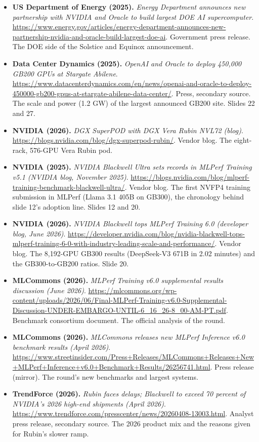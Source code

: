 \begin{itemize}[leftmargin=1.2em,itemsep=3pt]
\item \textbf{US Department of Energy (2025).} \textit{Energy Department announces new partnership with NVIDIA and Oracle to build largest DOE AI supercomputer}. \url{https://www.energy.gov/articles/energy-department-announces-new-partnership-nvidia-and-oracle-build-largest-doe-ai}. Government press release. The DOE side of the Solstice and Equinox announcement.
\item \textbf{Data Center Dynamics (2025).} \textit{OpenAI and Oracle to deploy 450,000 GB200 GPUs at Stargate Abilene}. \url{https://www.datacenterdynamics.com/en/news/openai-and-oracle-to-deploy-450000-gb200-gpus-at-stargate-abilene-data-center/}. Press, secondary source. The scale and power (1.2 GW) of the largest announced GB200 site. Slides 22 and 27.
\item \textbf{NVIDIA (2026).} \textit{DGX SuperPOD with DGX Vera Rubin NVL72 (blog)}. \url{https://blogs.nvidia.com/blog/dgx-superpod-rubin/}. Vendor blog. The eight-rack, 576-GPU Vera Rubin pod.
\item \textbf{NVIDIA (2025).} \textit{NVIDIA Blackwell Ultra sets records in MLPerf Training v5.1 (NVIDIA blog, November 2025)}. \url{https://blogs.nvidia.com/blog/mlperf-training-benchmark-blackwell-ultra/}. Vendor blog. The first NVFP4 training submission in MLPerf (Llama 3.1 405B on GB300), the chronology behind slide 12's adoption line. Slides 12 and 20.
\item \textbf{NVIDIA (2026).} \textit{NVIDIA Blackwell tops MLPerf Training 6.0 (developer blog, June 2026)}. \url{https://developer.nvidia.com/blog/nvidia-blackwell-tops-mlperf-training-6-0-with-industry-leading-scale-and-performance/}. Vendor blog. The 8,192-GPU GB300 results (DeepSeek-V3 671B in 2.02 minutes) and the GB300-to-GB200 ratios. Slide 20.
\item \textbf{MLCommons (2026).} \textit{MLPerf Training v6.0 supplemental results discussion (June 2026)}. \url{https://mlcommons.org/wp-content/uploads/2026/06/Final-MLPerf-Training-v6.0-Supplemental-Discussion-UNDER-EMBARGO-UNTIL-6_16_26-8_00-AM-PT.pdf}. Benchmark consortium document. The official analysis of the round.
\item \textbf{MLCommons (2026).} \textit{MLCommons releases new MLPerf Inference v6.0 benchmark results (April 2026)}. \url{https://www.streetinsider.com/Press+Releases/MLCommons+Releases+New+MLPerf+Inference+v6.0+Benchmark+Results/26256741.html}. Press release (mirror). The round's new benchmarks and largest systems.
\item \textbf{TrendForce (2026).} \textit{Rubin faces delays; Blackwell to exceed 70 percent of NVIDIA's 2026 high-end shipments (April 2026)}. \url{https://www.trendforce.com/presscenter/news/20260408-13003.html}. Analyst press release, secondary source. The 2026 product mix and the reasons given for Rubin's slower ramp.
\end{itemize}
